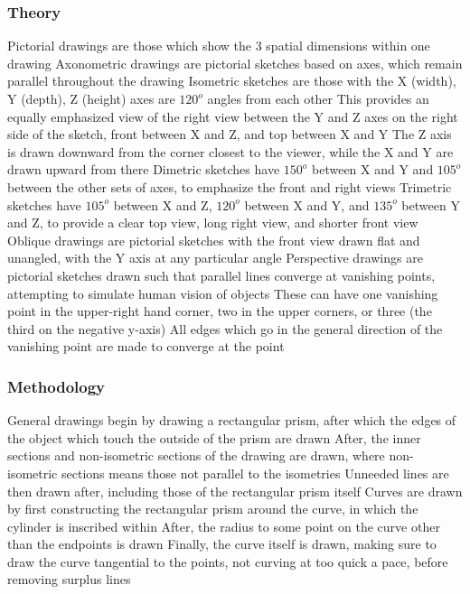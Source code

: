 \documentclass[11 pt, twoside]{article}
\newenvironment{outline*}
{
	\begin{outline}[enumerate]
	}
	{\end{outline}
}
\begin{document}
\subsubsection{Theory}
\begin{outline*}
\1 Pictorial drawings are those which show the 3 spatial dimensions within one drawing
\1 Axonometric drawings are pictorial sketches based on axes, which remain parallel throughout the drawing
\2 Isometric sketches are those with the X (width), Y (depth), Z (height) axes are $120^o$ angles from each other
\3 This provides an equally emphasized view of the right view between the Y and Z axes on the right side of the sketch, front between X and Z, and top between X and Y
\3 The Z axis is drawn downward from the corner closest to the viewer, while the X and Y are drawn upward from there
\2 Dimetric sketches have $150^o$ between X and Y and $105^o$ between the other sets of axes, to emphasize the front and right views
\2 Trimetric sketches have $105^o$ between X and Z, $120^o$ between X and Y, and $135^o$ between Y and Z, to provide a clear top view, long right view, and shorter front view
\1 Oblique drawings are pictorial sketches with the front view drawn flat and unangled, with the Y axis at any particular angle
\1 Perspective drawings are pictorial sketches drawn such that parallel lines converge at vanishing points, attempting to simulate human vision of objects
\2 These can have one vanishing point in the upper-right hand corner, two in the upper corners, or three (the third on the negative y-axis)
\2 All edges which go in the general direction of the vanishing point are made to converge at the point
\end{outline*}
\subsubsection{Methodology}
\begin{outline*}
\1 General drawings begin by drawing a rectangular prism, after which the edges of the object which touch the outside of the prism are drawn
\2 After, the inner sections and non-isometric sections of the drawing are drawn, where non-isometric sections means those not parallel to the isometries
\2 Unneeded lines are then drawn after, including those of the rectangular prism itself
\1 Curves are drawn by first constructing the rectangular prism around the curve, in which the cylinder is inscribed within
\2 After, the radius to some point on the curve other than the endpoints is drawn
\2 Finally, the curve itself is drawn, making sure to draw the curve tangential to the points, not curving at too quick a pace, before removing surplus lines
\end{outline*}
\end{document}
